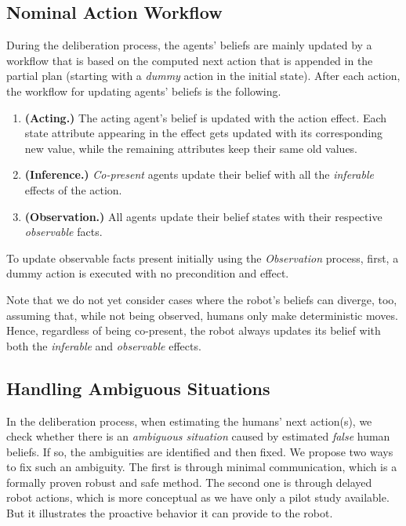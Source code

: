 \documentclass[letterpaper]{article} %
\begin{document}
\subsection{Nominal Action Workflow}
During the deliberation process, the agents' beliefs are mainly updated by a workflow that is based on the computed next action that is appended in the partial plan (starting with a \textit{dummy} action in the initial state). 
After each action, the workflow for updating agents' beliefs is the following.

\begin{enumerate}
    \item \textbf{(Acting.)} The acting agent's belief is updated with the action effect. Each state attribute appearing in the effect gets updated with its corresponding new value, while the remaining attributes keep their same old values.
    \item \textbf{(Inference.)} \textit{Co-present} agents update their belief with all the \textit{inferable} effects of the action.
    \item \textbf{(Observation.)} All agents update their belief states with their respective \textit{observable} facts.
\end{enumerate}

To update observable facts present initially using the \textit{Observation} process, first, a dummy action is executed with no precondition and effect.

Note that we do not yet consider cases where the robot's beliefs can diverge, too, assuming that, while not being observed, humans only make deterministic moves. Hence, regardless of being co-present, the robot always updates its belief with both the \textit{inferable} and \textit{observable} effects.

\subsection{Handling Ambiguous Situations}
In the deliberation process, when estimating the humans' next action(s), we check whether there is an \textit{ambiguous situation} caused by estimated \textit{false} human beliefs. 
If so, the ambiguities are identified and then fixed. 
We propose two ways to fix such an ambiguity. The first is through minimal communication, which is a formally proven robust and safe method. The second one is through delayed robot actions, which is more conceptual as we have only a pilot study available. But it illustrates the proactive behavior it can provide to the robot.
\end{document}
